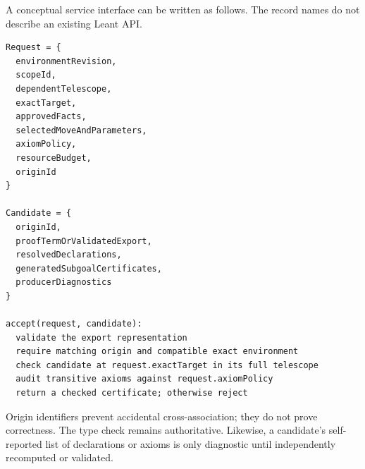 \documentclass[11pt,a4paper]{article}
\theoremstyle{remark}
\begin{document}
A conceptual service interface can be written as follows. The record names do not describe an existing Leant API.
\par\noindent\begin{minipage}{\linewidth}
\begin{lstlisting}[caption={Proposed logical contents of a reconstruction request and response.}]
Request = {
  environmentRevision,
  scopeId,
  dependentTelescope,
  exactTarget,
  approvedFacts,
  selectedMoveAndParameters,
  axiomPolicy,
  resourceBudget,
  originId
}

Candidate = {
  originId,
  proofTermOrValidatedExport,
  resolvedDeclarations,
  generatedSubgoalCertificates,
  producerDiagnostics
}

accept(request, candidate):
  validate the export representation
  require matching origin and compatible exact environment
  check candidate at request.exactTarget in its full telescope
  audit transitive axioms against request.axiomPolicy
  return a checked certificate; otherwise reject
\end{lstlisting}
\end{minipage}\par
Origin identifiers prevent accidental cross-association; they do not prove correctness. The type check remains authoritative. Likewise, a candidate's self-reported list of declarations or axioms is only diagnostic until independently recomputed or validated.

\clearpage
\end{document}
